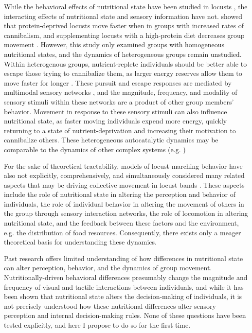 \documentclass[11pt,a4paper,oneside]{article}
\begin{document}
While the behavioral effects of nutritional state have been studied in locusts \citep{bazazi2011nutritional}, the interacting effects of nutritional state and sensory information have not. \citet{bazazi2011nutritional} showed that protein-deprived locusts move faster when in groups with increased rates of cannibalism, and supplementing locusts with a high-protein diet decreases group movement \citep{bazazi2011nutritional}. However, this study only examined groups with homogeneous nutritional states, and the dynamics of heterogeneous groups remain unstudied. Within heterogenous groups, nutrient-replete individuals should be better able to escape those trying to cannibalize them, as larger energy reserves allow them to move faster for longer \citep{arrese2010insect}. These pursuit and escape responses are mediated by multimodal sensory networks \citep{bazazi2008collective}, and the magnitude, frequency, and modality of sensory stimuli within these networks are a product of other group members' behavior. Movement in response to these sensory stimuli can also influence nutritional state, as faster moving individuals expend more energy, quickly returning to a state of nutrient-deprivation \citep{arrese2010insect} and increasing their motivation to cannibalize others. These heterogeneous autocatalytic dynamics may be comparable to the dynamics of other complex systems (e.g. \citealp{ortega2016visualization,bissette2013mechanisms})
\par
For the sake of theoretical tractability, models of locust marching behavior have also not explicitly, comprehensively, and simultaneously considered many related aspects that may be driving collective movement in locust bands \citep{guttal2012cannibalism,bazazi2011nutritional,romanczuk2009collective}. These aspects include the role of nutritional state in altering the perception and behavior of individuals, the role of individual behavior in altering the movement of others in the group through sensory interaction networks, the role of locomotion in altering nutritional state, and the feedback between these factors and the environment, e.g. the distribution of food resources. Consequently, there exists only a meager theoretical basis for understanding these dynamics.
\par
Past research offers limited understanding of how differences in nutritional state can alter perception, behavior, and the dynamics of group movement. Nutritionally-driven behavioral differences \citep{bazazi2011nutritional} presumably change the magnitude and frequency of visual and tactile interactions between individuals, and while it has been shown that nutritional state alters the decision-making of individuals, it is not precisely understood how these nutritional differences alter sensory perception and internal decision-making rules. None of these questions have been tested explicitly, and here I propose to do so for the first time.
\end{document}

